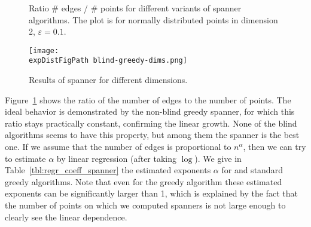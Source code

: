 \documentclass[]{ws-ijcga}
\newcommand{\eps}{\varepsilon}
\def \expDistFigPath {pics/}
\def \expDistDataPath {./}
\begin{document}
\begin{figure}[!htbp]
            \caption{Ratio \# edges / \# points for different variants of spanner 
            algorithms. The plot is for normally distributed points
            in dimension 2, $\eps = 0.1$.}
            \label{fig:spanner_ratio}
\end{figure}

\begin{figure}[ht!]
    \begin{centering}
    \texttt{[image: \\expDistFigPath blind-greedy-dims.png]}
    \caption{Results of \bgrdy spanner for different dimensions.}
    \label{fig:blind_greedy_dimensions}
    \end{centering}
\end{figure}


Figure~\ref{fig:spanner_ratio} shows the ratio of the number of edges to the number of points.
The ideal behavior is demonstrated by the non-blind greedy spanner,
for which this ratio stays practically constant, confirming the linear growth.
None of the blind algorithms seems to have this property, but among them
the \bgrdy spanner is the best one. If we assume that the number of edges
is proportional to $n^\alpha$, then we can try to estimate $\alpha$ by 
linear regression (after taking $\log$).  We give in Table~\ref{tbl:regr_coeff_spanner}
the estimated exponents $\alpha$ for \bgrdy and standard
greedy algorithms. Note that even for the greedy algorithm these estimated
exponents can be significantly larger than 1,
which is explained by the fact that the number of points
on which we computed spanners is not large enough to clearly see
the linear dependence.
\end{document}

